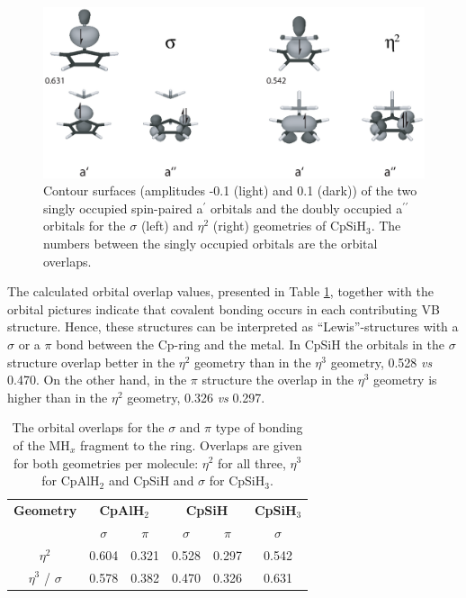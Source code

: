 \begin{figure} [htbp]
\begin{center}
\includegraphics[scale=0.67]{cyclopentadienyl/figures/sih3_sigma.eps}
\end{center}
\caption{Contour surfaces (amplitudes -0.1 (light) and 0.1 (dark)) of the two singly occupied spin-paired a$^\prime$ orbitals and the doubly occupied a$^{\prime\prime}$ orbitals for the $\sigma$ (left) and $\eta^{2}$ (right) geometries of CpSiH$_3$. The numbers between the singly occupied orbitals are the orbital overlaps.}
\label{ch4.fig.sih3}
\end{figure}

The calculated orbital overlap values, presented in Table \ref{ch4.tab.overlaps}, together with the orbital pictures indicate that covalent bonding occurs in each contributing VB structure. Hence, these structures can be interpreted as ``Lewis''-structures with a $\sigma$ or a $\pi$ bond between the Cp-ring and the metal. In CpSiH the orbitals in the $\sigma$ structure overlap better in the $\eta^2$ geometry than in the $\eta^3$ geometry, 0.528 \textit{vs} 0.470. On the other hand, in the $\pi$ structure the overlap in the $\eta^{3}$ geometry is higher than in the $\eta^{2}$ geometry, 0.326 \textit{vs} 0.297.
\begin{table}[hbtp]
\caption{The orbital overlaps for the $\sigma$ and $\pi$ type of bonding of the MH$_x$ fragment to the ring. Overlaps are given for both geometries per molecule: $\eta^2$ for all three, $\eta^3$ for CpAlH$_2$ and CpSiH and $\sigma$ for CpSiH$_3$.}
\center
\begin{tabular}{|c|cc|cc|c|}
\hline
\textbf{Geometry}&
\multicolumn{2}{c|}{\textbf{CpAlH$_2$}}&
\multicolumn{2}{c|}{\textbf{CpSiH}}&
\textbf{CpSiH$_3$}\\
&
$\sigma$&
$\pi$&
$\sigma$&
$\pi$&
$\sigma$\\
\hline
$\eta^{2}$& 0.604 & 0.321 & 0.528 & 0.297 & 0.542 \\
$\eta^{3}$ / $\sigma$ & 0.578 & 0.382 & 0.470 & 0.326 & 0.631 \\
\hline
\end{tabular}
\label{ch4.tab.overlaps}
\end{table}

